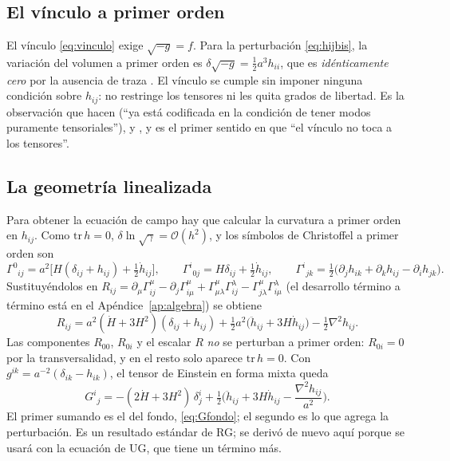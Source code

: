 \subsection{El vínculo a primer orden}

El vínculo \eqref{eq:vinculo} exige $\sqrt{-g}=f$. Para la perturbación \eqref{eq:hijbis}, la variación del volumen a primer orden es $\delta\sqrt{-g}=\tfrac12a^3h_{ii}$, que es \emph{idénticamente cero} por la ausencia de traza . El vínculo se cumple sin imponer ninguna condición sobre $h_{ij}$: no restringe los tensores ni les quita grados de libertad. Es la observación que hacen \cite{fabris22} (``ya está codificada en la condición de tener modos puramente tensoriales''), \cite{basak16} y \cite{cho15}, y es el primer sentido en que ``el vínculo no toca a los tensores''.

\subsection{La geometría linealizada}
\label{sec:tt-geometria}

Para obtener la ecuación de campo hay que calcular la curvatura a primer orden en $h_{ij}$. Como $\mathrm{tr}\,h=0$, $\delta\ln\sqrt\gamma=\mathcal O(h^2)$, y los símbolos de Christoffel a primer orden son
\begin{equation}
\Gamma^0{}_{ij}=a^2\Big[H(\delta_{ij}+h_{ij})+\tfrac12\dot h_{ij}\Big],\qquad
\Gamma^i{}_{0j}=H\delta_{ij}+\tfrac12\dot h_{ij},\qquad
\Gamma^i{}_{jk}=\tfrac12\big(\partial_jh_{ik}+\partial_kh_{ij}-\partial_ih_{jk}\big).
\label{eq:Gammah}
\end{equation}
Sustituyéndolos en $R_{ij}=\partial_\mu\Gamma^\mu_{ij}-\partial_j\Gamma^\mu_{i\mu}+\Gamma^\mu_{\mu\lambda}\Gamma^\lambda_{ij}-\Gamma^\mu_{j\lambda}\Gamma^\lambda_{i\mu}$ (el desarrollo término a término está en el Apéndice~\ref{ap:algebra}) se obtiene 
\begin{equation}
R_{ij}=a^2(\dot H+3H^2)(\delta_{ij}+h_{ij})+\tfrac12a^2\big(\ddot h_{ij}+3H\dot h_{ij}\big)-\tfrac12\nabla^2h_{ij}.
\label{eq:Rijh}
\end{equation}
Las componentes $R_{00}$, $R_{0i}$ y el escalar $R$ \emph{no} se perturban a primer orden: $R_{0i}=0$ por la transversalidad, y en el resto solo aparece $\mathrm{tr}\,h=0$. Con $g^{ik}=a^{-2}(\delta_{ik}-h_{ik})$, el tensor de Einstein en forma mixta queda
\begin{equation}
G^i{}_j=-(2\dot H+3H^2)\,\delta^i_j+\tfrac12\Big(\ddot h_{ij}+3H\dot h_{ij}-\frac{\nabla^2h_{ij}}{a^2}\Big).
\label{eq:GTT}
\end{equation}
El primer sumando es el del fondo, \eqref{eq:Gfondo}; el segundo es lo que agrega la perturbación. Es un resultado estándar de RG; se derivó de nuevo aquí porque se usará con la ecuación de UG, que tiene un término más.

